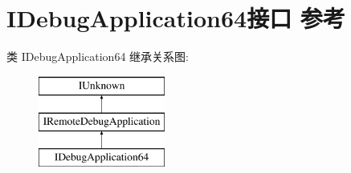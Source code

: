 \hypertarget{interface_i_debug_application64}{}\section{I\+Debug\+Application64接口 参考}
\label{interface_i_debug_application64}
类 I\+Debug\+Application64 继承关系图\+:\begin{figure}[H]
\begin{center}
\leavevmode
\includegraphics[height=3.000000cm]{interface_i_debug_application64}
\end{center}
\end{figure}
